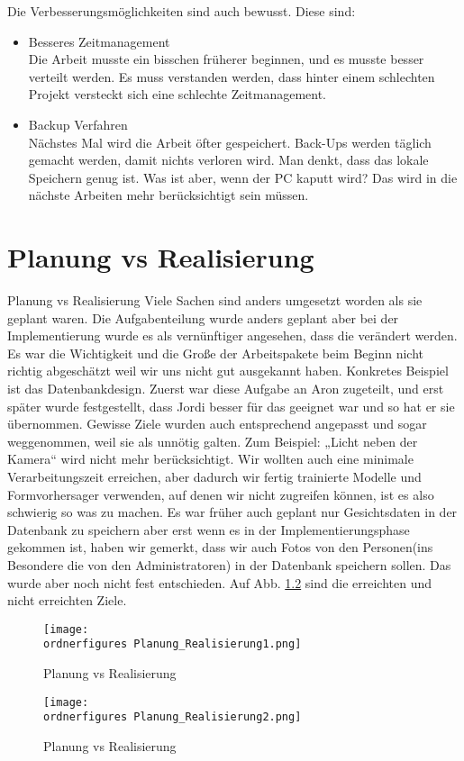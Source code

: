 	Die Verbesserungsmöglichkeiten sind auch bewusst. Diese sind: 
\begin{itemize}	
	\item Besseres Zeitmanagement \\
	
	Die Arbeit musste ein bisschen früherer beginnen, und es musste besser verteilt werden. Es muss verstanden werden, dass hinter einem schlechten Projekt versteckt sich eine schlechte Zeitmanagement.
	\item Backup Verfahren \\
	
	Nächstes Mal wird die Arbeit öfter gespeichert. Back-Ups werden täglich gemacht werden, damit nichts verloren wird. Man denkt, dass das lokale Speichern genug ist. Was ist aber, wenn der PC kaputt wird? Das wird in die nächste Arbeiten mehr berücksichtigt sein müssen.
\end{itemize}

\chapter{Planung vs Realisierung}
Planung vs Realisierung 
Viele Sachen sind anders umgesetzt worden als sie geplant waren. Die Aufgabenteilung wurde anders geplant aber bei der Implementierung wurde es als vernünftiger angesehen, dass die verändert werden. 
Es war die Wichtigkeit und die Große der Arbeitspakete beim Beginn nicht richtig abgeschätzt weil wir uns nicht gut ausgekannt haben.
Konkretes Beispiel ist das Datenbankdesign. Zuerst war diese Aufgabe an Aron zugeteilt, und erst später wurde festgestellt, dass Jordi besser für das geeignet war und so hat er sie übernommen. 
Gewisse Ziele wurden auch entsprechend angepasst und sogar weggenommen, weil sie als unnötig galten.  Zum Beispiel: „Licht neben der Kamera“ wird nicht mehr berücksichtigt.
Wir wollten auch eine minimale Verarbeitungszeit erreichen, aber dadurch wir fertig trainierte Modelle und Formvorhersager verwenden, auf denen wir nicht zugreifen können, ist es also schwierig so was zu machen. 
Es war früher auch geplant nur Gesichtsdaten in der Datenbank zu speichern aber erst wenn es in der Implementierungsphase gekommen ist, haben wir gemerkt, dass wir auch Fotos von den Personen(ins Besondere die von den Administratoren) in der Datenbank speichern sollen. Das wurde aber noch nicht fest entschieden. Auf Abb. \ref{fig:Planung_Realisierung} sind die erreichten und nicht erreichten Ziele.
\begin{figure}[H]
	\texttt{[image: \\ordnerfigures Planung\_Realisierung1.png]}
	\caption{Planung vs Realisierung}
	\label{fig:Planung_Realisierung}
\end{figure}
\begin{figure}[H]
	\texttt{[image: \\ordnerfigures Planung\_Realisierung2.png]}
	\caption{Planung vs Realisierung}
	\label{fig:Planung_Realisierung}
\end{figure}
